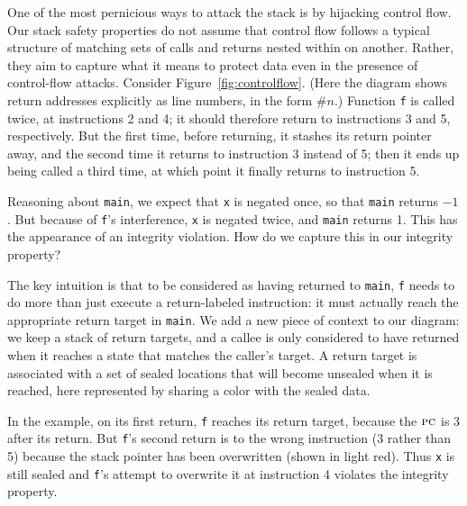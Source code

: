 \documentclass[acmsmall,review,anonymous]{acmart}\settopmatter{printfolios=true,printccs=false,printacmref=false}
\begin{document}
\label{sec:controlflow} %

One of the most pernicious ways to attack the stack is by hijacking control flow.
Our stack safety properties do not assume that control flow follows a typical structure
of matching sets of calls and returns nested within on another.
Rather, they aim to capture what it means to protect data even in the presence of control-flow attacks.
Consider Figure~\ref{fig:controlflow}.
(Here the diagram shows return addresses explicitly as line numbers, in the form $\#n$.)
Function {\tt f} is called twice, at instructions 2 and 4; it should therefore return to instructions
3 and 5, respectively. But the first time, before returning, it stashes its
return pointer away, and the second time it returns to instruction 3 instead of 5; then it ends
up being called a third time, at which point it finally returns to instruction 5.

Reasoning about {\tt main}, we expect that {\tt x} is negated once, so that {\tt main} returns
$-1$. But because of {\tt f}'s interference, {\tt x} is negated twice, and {\tt main} returns 1.
This has the appearance of an integrity violation.  How do we capture this in our
integrity property?

The key intuition is that to be considered as having returned to {\tt main}, {\tt f} needs
to do more than just execute a return-labeled instruction: it must actually reach the
appropriate return target in {\tt main}.
We add a new piece of context to our diagram: we keep a stack of return targets, and a callee is
only considered to have returned when it reaches a state that matches the caller's target.
A return target is associated with a set of sealed locations that will become unsealed
when it is reached, here represented by sharing a color with the sealed data.

In the example, on its first return, {\tt f} reaches its return target, because the
\(\textsc{pc}\) is 3 after its return. But {\tt f}'s second return is to the wrong instruction
(3 rather than 5) because the stack pointer has been overwritten (shown in light red).
Thus {\tt x} is still sealed and {\tt f}'s attempt to overwrite it at instruction 4
violates the integrity property.
\end{document}
